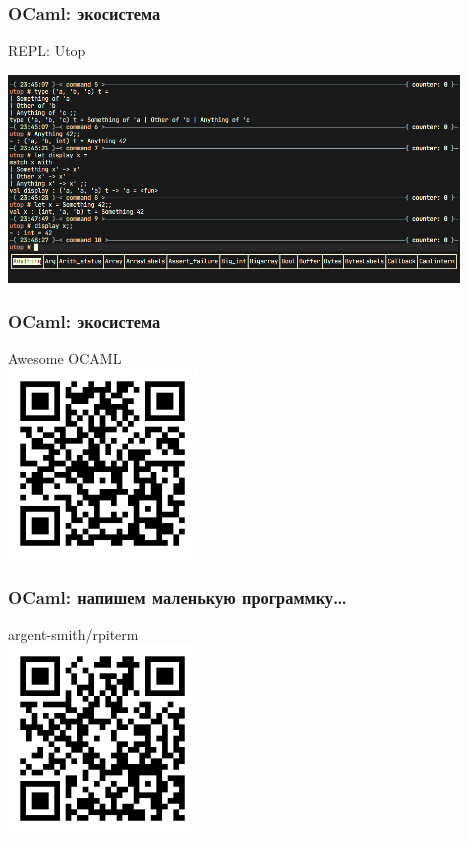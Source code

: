 \begin{frame}
  \frametitle{OCaml: экосистема}

  \Large REPL: Utop
  \begin{center}
    \includegraphics[height=55mm,keepaspectratio]{./images/utop-shot.png}
  \end{center}
\end{frame}

\begin{frame}
  \frametitle{OCaml: экосистема}

  \begin{center}
    \LARGE Awesome OCAML\\
    \vspace{3mm}
    \includegraphics[width=5cm,keepaspectratio]{./images/qr-awesome-ocaml.png}
  \end{center}
\end{frame}

\begin{frame}
  \frametitle{OCaml: напишем маленькую программку\dots}

  \begin{center}
    \Large argent-smith/rpiterm\\
    \vspace{3mm}
    \includegraphics[width=5cm,keepaspectratio]{./images/qr-rpiterm.png}
  \end{center}
\end{frame}

